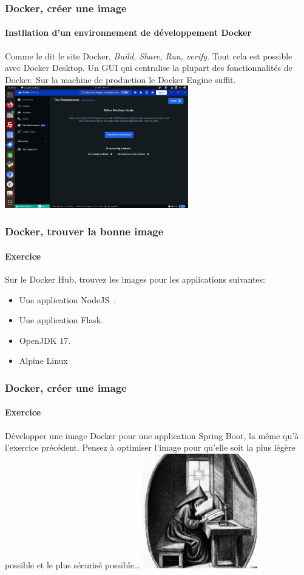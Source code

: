 \documentclass{beamer}
\begin{document}
    \begin{frame}
        \transdissolve
        \frametitle{Docker, créer une image}
        \framesubtitle{Instllation d'un environnement de développement Docker}
        Comme le dit le site Docker, \textit{Build, Share, Run, verify}.
        Tout cela est possible avec Docker Desktop.
        Un GUI qui centralise la plupart des fonctionnalités de Docker.
        \bigbreak
        Sur la machine de production le Docker Engine suffit.
        \bigbreak
        \centering
        \includegraphics[width=8cm]{image/docker-desktop}
    \end{frame}

    \begin{frame}
        \transdissolve
        \frametitle{Docker, trouver la bonne image}
        \framesubtitle{Exercice}
        Sur le Docker Hub, trouvez les images pour les applications suivantes:
        \begin{itemize}
            \item Une application NodeJS~.
            \item Une application Flask.
            \item OpenJDK 17.
            \item Alpine Linux
        \end{itemize}
    \end{frame}

    \begin{frame}
        \transdissolve
        \frametitle{Docker, créer une image}
        \framesubtitle{Exercice}
        Développer une image Docker pour une application Spring Boot, la même qu'à l'exercice précédent.
        \bigbreak
        Pensez à optimiser l'image pour qu'elle soit la plus légère possible et le plus sécurisé possible\ldots
        \bigbreak
        \centering
        \includegraphics[width=5cm]{image/young-studying}
    \end{frame}
\end{document}
